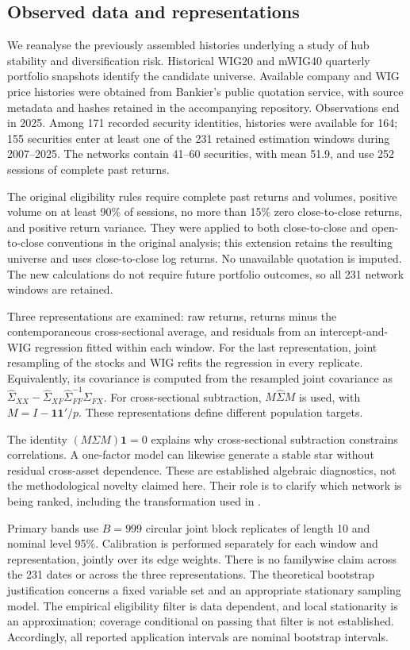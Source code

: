 \documentclass[pdflatex,sn-mathphys-ay]{sn-jnl}
\theoremstyle{thmstyleone}
\theoremstyle{thmstyletwo}
\begin{document}
\subsection{Observed data and representations}
We reanalyse the previously assembled histories underlying a study of hub stability and diversification risk. Historical WIG20 and mWIG40 quarterly portfolio snapshots identify the candidate universe. Available company and WIG price histories were obtained from Bankier's public quotation service, with source metadata and hashes retained in the accompanying repository. Observations end in 2025. Among 171 recorded security identities, histories were available for 164; 155 securities enter at least one of the 231 retained estimation windows during 2007--2025. The networks contain 41--60 securities, with mean 51.9, and use 252 sessions of complete past returns.

The original eligibility rules require complete past returns and volumes, positive volume on at least 90\% of sessions, no more than 15\% zero close-to-close returns, and positive return variance. They were applied to both close-to-close and open-to-close conventions in the original analysis; this extension retains the resulting universe and uses close-to-close log returns. No unavailable quotation is imputed. The new calculations do not require future portfolio outcomes, so all 231 network windows are retained.

Three representations are examined: raw returns, returns minus the contemporaneous cross-sectional average, and residuals from an intercept-and-WIG regression fitted within each window. For the last representation, joint resampling of the stocks and WIG refits the regression in every replicate. Equivalently, its covariance is computed from the resampled joint covariance as $\widehat\Sigma_{XX}-\widehat\Sigma_{XF}\widehat\Sigma_{FF}^{-1}\widehat\Sigma_{FX}$. For cross-sectional subtraction, $M\widehat\Sigma M$ is used, with $M=I-\mathbf1\mathbf1'/p$. These representations define different population targets.

The identity $(M\Sigma M)\mathbf1=0$ explains why cross-sectional subtraction constrains correlations. A one-factor model can likewise generate a stable star without residual cross-asset dependence. These are established algebraic diagnostics, not the methodological novelty claimed here. Their role is to clarify which network is being ranked, including the transformation used in \citet{galazka2011}.

Primary bands use $B=999$ circular joint block replicates of length 10 and nominal level 95\%. Calibration is performed separately for each window and representation, jointly over its edge weights. There is no familywise claim across the 231 dates or across the three representations. The theoretical bootstrap justification concerns a fixed variable set and an appropriate stationary sampling model. The empirical eligibility filter is data dependent, and local stationarity is an approximation; coverage conditional on passing that filter is not established. Accordingly, all reported application intervals are nominal bootstrap intervals.
\end{document}
